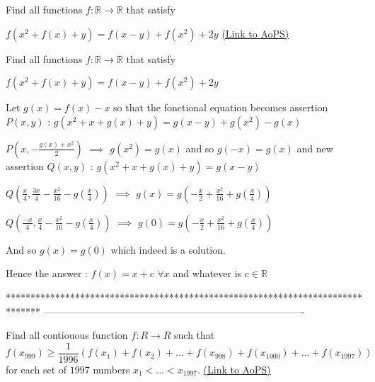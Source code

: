 \begin{problem}
	Find all functions $f:\mathbb{R} \to \mathbb{R}$ that satisfy

$f(x^2+f(x)+y) = f(x-y)+f(x^2)+2y$
	\flushright \href{https://artofproblemsolving.com/community/c6h534271}{(Link to AoPS)}
\end{problem}



\begin{solution}
	\begin{tcolorbox}Find all functions $f:\mathbb{R} \to \mathbb{R}$ that satisfy

$f(x^2+f(x)+y) = f(x-y)+f(x^2)+2y$\end{tcolorbox}
Let $g(x)=f(x)-x$ so that the fonctional equation becomes assertion $P(x,y)$ : $g(x^2+x+g(x)+y)=g(x-y)+g(x^2)-g(x)$

$P(x,-\frac{g(x)+x^2}2)$ $\implies$ $g(x^2)=g(x)$ and so $g(-x)=g(x)$ and new assertion $Q(x,y)$ : $g(x^2+x+g(x)+y)=g(x-y)$

$Q(\frac{x}4,\frac{3x}4-\frac{x^2}{16}-g(\frac{x}4))$ $\implies$ $g(x)=g(-\frac{x}2+\frac{x^2}{16}+g(\frac{x}4))$

$Q(\frac{-x}4,\frac{x}4-\frac{x^2}{16}-g(\frac{x}4))$ $\implies$ $g(0)=g(-\frac{x}2+\frac{x^2}{16}+g(\frac{x}4))$

And so $g(x)=g(0)$ which indeed is a solution.

Hence the answer : $\boxed{f(x)=x+c}$ $\forall x$ and whatever is $c\in\mathbb R$
\end{solution}
*******************************************************************************
-------------------------------------------------------------------------------

\begin{problem}
	Find  all contiouous  function $f:R \rightarrow R$  such that \[ f(x_{999})\ge \frac{1}{1996}(f(x_1)+f(x_2)+...+f(x_{998})+f(x_{1000}) +...+f(x_{1997}))  \]
for each set of $1997$ numbers $ x_1< ...< x_{1997} $.
	\flushright \href{https://artofproblemsolving.com/community/c6h534324}{(Link to AoPS)}
\end{problem}



